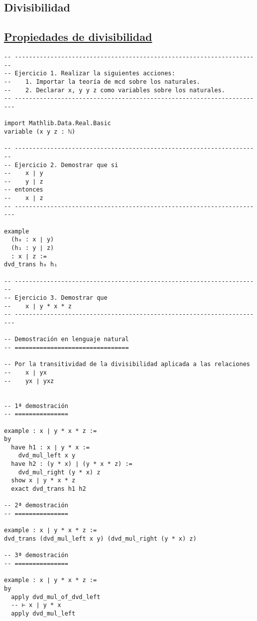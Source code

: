 \subsection{Divisibilidad}
\label{sec:org19e0a3a}

\subsection{\href{./src/Basicos/Propiedades\_de\_divisibilidad.lean}{Propiedades de divisibilidad}}
\label{sec:org499a762}
\begin{verbatim}
-- ---------------------------------------------------------------------
-- Ejercicio 1. Realizar la siguientes acciones:
--    1. Importar la teoría de mcd sobre los naturales.
--    2. Declarar x, y y z como variables sobre los naturales.
-- ----------------------------------------------------------------------

import Mathlib.Data.Real.Basic
variable (x y z : ℕ)

-- ---------------------------------------------------------------------
-- Ejercicio 2. Demostrar que si
--    x ∣ y
--    y ∣ z
-- entonces
--    x ∣ z
-- ----------------------------------------------------------------------

example
  (h₀ : x ∣ y)
  (h₁ : y ∣ z)
  : x ∣ z :=
dvd_trans h₀ h₁

-- ---------------------------------------------------------------------
-- Ejercicio 3. Demostrar que
--    x ∣ y * x * z
-- ----------------------------------------------------------------------

-- Demostración en lenguaje natural
-- ================================

-- Por la transitividad de la divisibilidad aplicada a las relaciones
--    x ∣ yx
--    yx ∣ yxz


-- 1ª demostración
-- ===============

example : x ∣ y * x * z :=
by
  have h1 : x ∣ y * x :=
    dvd_mul_left x y
  have h2 : (y * x) ∣ (y * x * z) :=
    dvd_mul_right (y * x) z
  show x ∣ y * x * z
  exact dvd_trans h1 h2

-- 2ª demostración
-- ===============

example : x ∣ y * x * z :=
dvd_trans (dvd_mul_left x y) (dvd_mul_right (y * x) z)

-- 3ª demostración
-- ===============

example : x ∣ y * x * z :=
by
  apply dvd_mul_of_dvd_left
  -- ⊢ x ∣ y * x
  apply dvd_mul_left


\end{verbatim}
